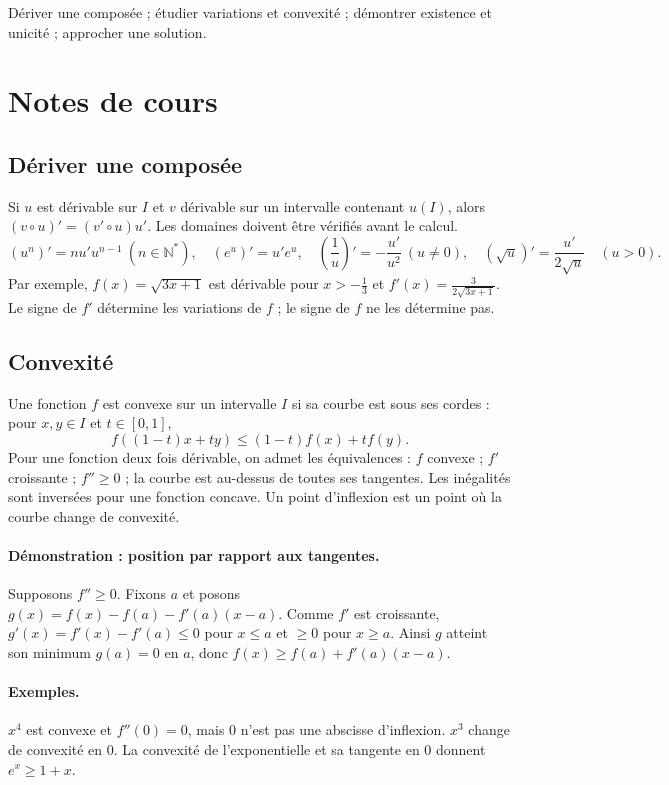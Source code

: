 \label{ch:4}


\begin{keypoint}[Objectifs]Dériver une composée ; étudier variations et convexité ; démontrer existence et unicité ; approcher une solution.\end{keypoint}

\section{Notes de cours}
\subsection{Dériver une composée}
Si $u$ est dérivable sur $I$ et $v$ dérivable sur un intervalle contenant $u(I)$, alors $(v\circ u)'=(v'\circ u)u'$. Les domaines doivent être vérifiés avant le calcul.
\[ (u^n)'=nu'u^{n-1}\ (n\in\mathbb N^*),\quad(e^u)'=u'e^u,\quad
(\frac{1}{u})'=-\frac{u'}{u^2}\ (u\ne0),\quad(\sqrt u)'=\frac{u'}{2\sqrt u}\quad(u>0).\]
Par exemple, $f(x)=\sqrt{3x+1}$ est dérivable pour $x>-\frac{1}{3}$ et $f'(x)=\frac{3}{2\sqrt{3x+1}}$. Le signe de $f'$ détermine les variations de $f$ ; le signe de $f$ ne les détermine pas.
\subsection{Convexité}
Une fonction $f$ est convexe sur un intervalle $I$ si sa courbe est sous ses cordes : pour $x,y\in I$ et $t\in[0,1]$,
\[f((1-t)x+ty)\le(1-t)f(x)+tf(y).\]
Pour une fonction deux fois dérivable, on admet les équivalences : $f$ convexe ; $f'$ croissante ; $f''\ge0$ ; la courbe est au-dessus de toutes ses tangentes. Les inégalités sont inversées pour une fonction concave. Un point d'inflexion est un point où la courbe change de convexité.
\paragraph{Démonstration : position par rapport aux tangentes.} Supposons $f''\ge0$. Fixons $a$ et posons $g(x)=f(x)-f(a)-f'(a)(x-a)$. Comme $f'$ est croissante, $g'(x)=f'(x)-f'(a)\le0$ pour $x\le a$ et $\ge0$ pour $x\ge a$. Ainsi $g$ atteint son minimum $g(a)=0$ en $a$, donc $f(x)\ge f(a)+f'(a)(x-a)$.
\paragraph{Exemples.} $x^4$ est convexe et $f''(0)=0$, mais $0$ n'est pas une abscisse d'inflexion. $x^3$ change de convexité en $0$. La convexité de l'exponentielle et sa tangente en $0$ donnent $e^x\ge1+x$.
